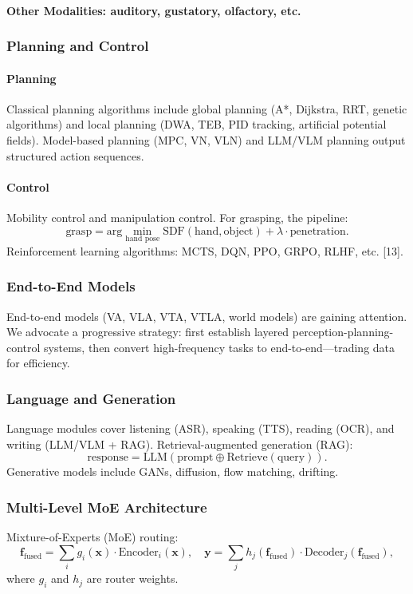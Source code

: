 \documentclass[12pt,a4paper]{article}
\begin{document}
\paragraph{Other Modalities: auditory, gustatory, olfactory, etc.}

\subsubsection{Planning and Control}
\paragraph{Planning}
Classical planning algorithms include global planning (A*, Dijkstra, RRT, genetic algorithms) and local planning (DWA, TEB, PID tracking, artificial potential fields). Model-based planning (MPC, VN, VLN) and LLM/VLM planning output structured action sequences.

\paragraph{Control}
Mobility control and manipulation control. For grasping, the pipeline:
\[
\text{grasp} = \text{arg}\min_{\text{hand pose}} \text{SDF}(\text{hand}, \text{object}) + \lambda \cdot \text{penetration}.
\]
Reinforcement learning algorithms: MCTS, DQN, PPO, GRPO, RLHF, etc. [13].

\subsubsection{End-to-End Models}
End-to-end models (VA, VLA, VTA, VTLA, world models) are gaining attention. We advocate a progressive strategy: first establish layered perception-planning-control systems, then convert high-frequency tasks to end-to-end—trading data for efficiency.

\subsubsection{Language and Generation}
Language modules cover listening (ASR), speaking (TTS), reading (OCR), and writing (LLM/VLM + RAG). Retrieval-augmented generation (RAG):
\[
\text{response} = \text{LLM}(\text{prompt} \oplus \text{Retrieve}(\text{query})).
\]
Generative models include GANs, diffusion, flow matching, drifting.

\subsubsection{Multi-Level MoE Architecture}
Mixture-of-Experts (MoE) routing:
\[
\mathbf{f}_{\text{fused}} = \sum_{i} g_i(\mathbf{x}) \cdot \text{Encoder}_i(\mathbf{x}), \quad \mathbf{y} = \sum_{j} h_j(\mathbf{f}_{\text{fused}}) \cdot \text{Decoder}_j(\mathbf{f}_{\text{fused}}),
\]
where $g_i$ and $h_j$ are router weights.
\end{document}
